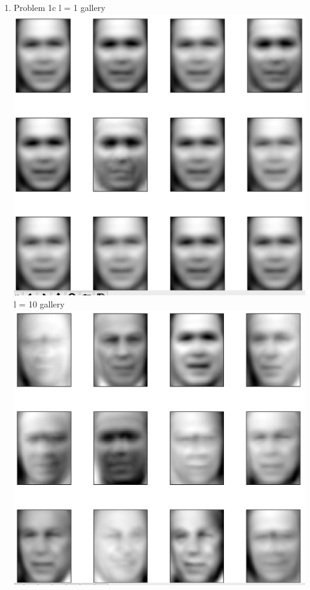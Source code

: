 \documentclass[11pt]{article}
\newcommand{\solution}[1]{{{\color{blue}{\bf Solution:} {#1}}}}
\begin{document}
\begin{enumerate}
\item Problem 1c
\solution{
\newline{}
l = 1 gallery \newline{}
\includegraphics[scale = 0.6]{pca_l=1.png} \newline{} 
\newline{}
l = 10 gallery \newline{}
\includegraphics[scale = 0.6]{pca_l=10.png} \newline{} \newpage
}
\end{enumerate}
\end{document}
